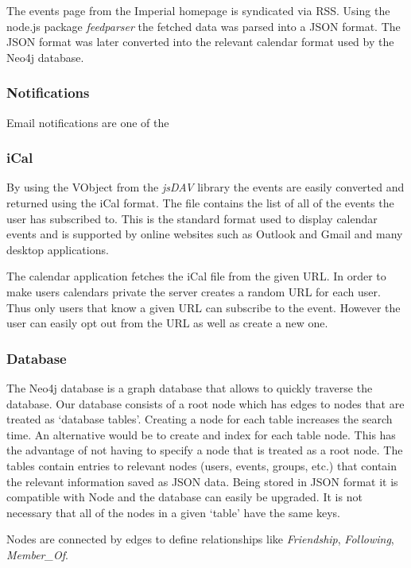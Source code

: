 \documentclass[11pt]{article}
\begin{document}
The events page from the Imperial homepage is syndicated via RSS. Using the node.js package \textit{feedparser} the fetched data was parsed into a JSON format. The JSON format was later converted into the relevant calendar format used by the Neo4j database.

\subsubsection{Notifications}
Email notifications are one of the 

\subsubsection{iCal}

By using the VObject from the \textit{jsDAV} library the events are easily converted and returned using the iCal format. The file contains the list of all of the events the user has subscribed to. This is the standard format used to display calendar events and is supported by online websites such as Outlook and Gmail and many desktop applications.

The calendar application fetches the iCal file from the given URL. In order to make users calendars private the server creates a random URL for each user. Thus only users that know a given URL can subscribe to the event. However the user can easily opt out from the URL as well as create a new one.

\subsubsection{Database}

The Neo4j database is a graph database that allows to quickly traverse the database.
Our database consists of a root node which has edges to nodes that are treated as `database tables'.
Creating a node for each table increases the search time. An alternative would be to create and index for each table node. This has the advantage of not having to specify a node that is treated as a root node.
The tables contain entries to relevant nodes (users, events, groups, etc.) that contain the relevant information saved as JSON data. Being stored in JSON format it is compatible with Node and the database can easily be upgraded. It is not necessary that all of the nodes in a given `table' have the same keys.

Nodes are connected by edges to define relationships like \textit{Friendship}, \textit{Following}, \textit{Member\_Of}.
\end{document}
